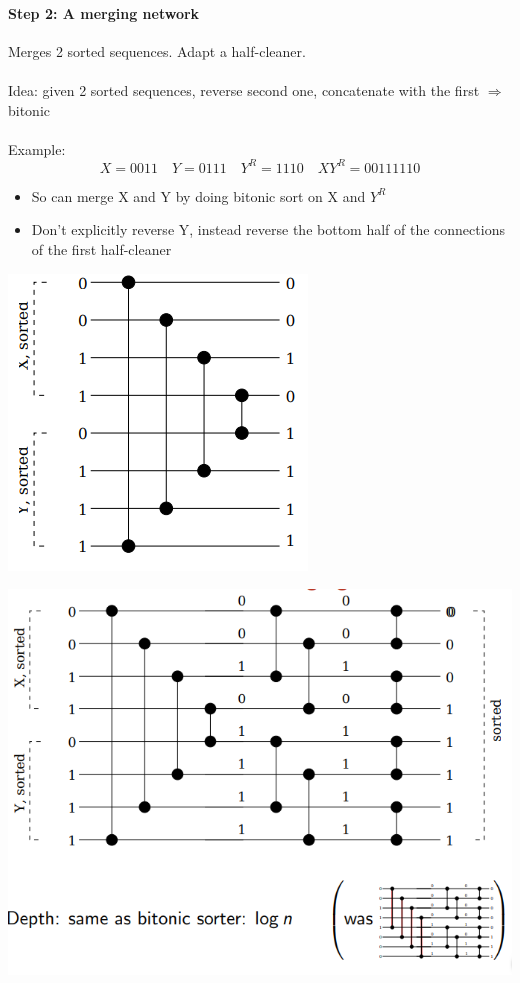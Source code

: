 \documentclass{article}[18pt]
\begin{document}
\paragraph{Step 2: A merging network}
Merges 2 sorted sequences. Adapt a half-cleaner.\\
\\
Idea: given 2 sorted sequences, reverse second one, concatenate with the first $\Rightarrow$ bitonic\\
\\
Example:\\
$$X=0011 \quad Y=0111 \quad Y^R=1110 \quad XY^R=00111110$$
\begin{itemize}
	\item So can merge X and Y by doing bitonic sort on X and $Y^R$
	\item Don't explicitly reverse Y, instead reverse the bottom half of the connections of the first half-cleaner
\end{itemize}
\begin{center}
	\includegraphics[scale=0.7]{reverse_cleaner}
\end{center}
\begin{center}
	\includegraphics[scale=0.7]{full_network}
\end{center}
\end{document}
